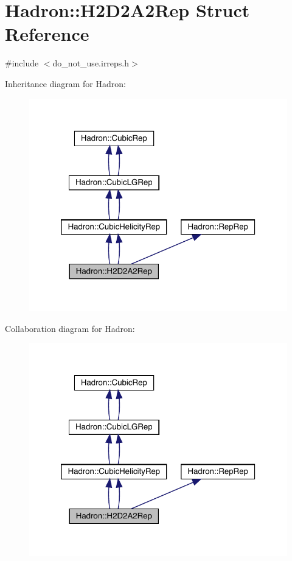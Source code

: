\hypertarget{structHadron_1_1H2D2A2Rep}{}\section{Hadron\+:\+:H2\+D2\+A2\+Rep Struct Reference}
\label{structHadron_1_1H2D2A2Rep}


{\ttfamily \#include $<$do\+\_\+not\+\_\+use.\+irreps.\+h$>$}



Inheritance diagram for Hadron\+:\nopagebreak
\begin{figure}[H]
\begin{center}
\leavevmode
\includegraphics[width=320pt]{d3/d3e/structHadron_1_1H2D2A2Rep__inherit__graph}
\end{center}
\end{figure}


Collaboration diagram for Hadron\+:\nopagebreak
\begin{figure}[H]
\begin{center}
\leavevmode
\includegraphics[width=320pt]{dd/d75/structHadron_1_1H2D2A2Rep__coll__graph}
\end{center}
\end{figure}

